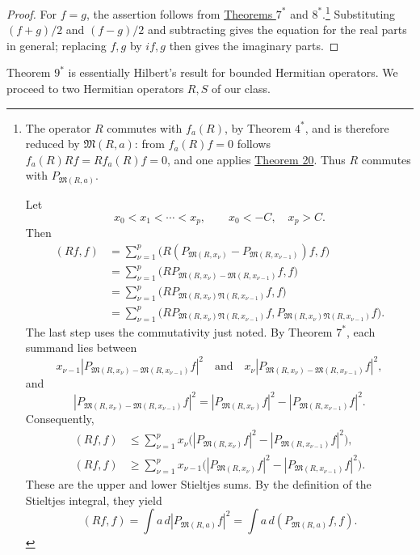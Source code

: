 ﻿\documentclass[paper=b5,fontsize=13pt,bookmarkpackage=false,twoside]{scrartcl}
\begin{document}
\begin{proof}
For \(f=g\), the assertion follows from
\hyperref[thm:appII-7]{Theorems \(7^*\)} and
\hyperref[thm:appII-8]{\(8^*\)}.\footnote{\label{fn:67}The operator \(R\) commutes
with \(f_a(R)\), by Theorem \(4^*\), and is therefore reduced by
\(\mathfrak M(R,a)\): from \(f_a(R)f=0\) follows
\(f_a(R)Rf=Rf_a(R)f=0\), and one applies \hyperref[thm:20]{Theorem 20}.  Thus \(R\)
commutes with \(P_{\mathfrak M(R,a)}\).

Let
\[
  x_0<x_1<\cdots<x_p,\qquad x_0<-C,\quad x_p>C.
\]
Then
\begin{align*}
 (Rf,f)
 &=\sum_{\nu=1}^{p}
   \bigl(R(P_{\mathfrak M(R,x_\nu)}
      -P_{\mathfrak M(R,x_{\nu-1})})f,f\bigr)\\
 &=\sum_{\nu=1}^{p}
   \bigl(RP_{\mathfrak M(R,x_\nu)-\mathfrak M(R,x_{\nu-1})}f,f\bigr)\\
 &=\sum_{\nu=1}^{p}
   \bigl(RP_{\mathfrak M(R,x_\nu)\mathfrak N(R,x_{\nu-1})}f,f\bigr)\\
 &=\sum_{\nu=1}^{p}
   \bigl(RP_{\mathfrak M(R,x_\nu)\mathfrak N(R,x_{\nu-1})}f,
         P_{\mathfrak M(R,x_\nu)\mathfrak N(R,x_{\nu-1})}f\bigr).
\end{align*}
The last step uses the commutativity just noted.  By Theorem \(7^*\),
each summand lies between
\[
 x_{\nu-1}
 |P_{\mathfrak M(R,x_\nu)-\mathfrak M(R,x_{\nu-1})}f|^2
 \quad\text{and}\quad
 x_\nu
 |P_{\mathfrak M(R,x_\nu)-\mathfrak M(R,x_{\nu-1})}f|^2,
\]
and
\[
 |P_{\mathfrak M(R,x_\nu)-\mathfrak M(R,x_{\nu-1})}f|^2
 =|P_{\mathfrak M(R,x_\nu)}f|^2
  -|P_{\mathfrak M(R,x_{\nu-1})}f|^2.
\]
Consequently,
\begin{align*}
 (Rf,f)
 &\leq\sum_{\nu=1}^{p}x_\nu
 \bigl(
 |P_{\mathfrak M(R,x_\nu)}f|^2
 -|P_{\mathfrak M(R,x_{\nu-1})}f|^2
 \bigr),\\
 (Rf,f)
 &\geq\sum_{\nu=1}^{p}x_{\nu-1}
 \bigl(
 |P_{\mathfrak M(R,x_\nu)}f|^2
 -|P_{\mathfrak M(R,x_{\nu-1})}f|^2
 \bigr).
\end{align*}
These are the upper and lower Stieltjes sums.  By the definition of
the Stieltjes integral, they yield
\[
  (Rf,f)=\int a\,d|P_{\mathfrak M(R,a)}f|^2
        =\int a\,d(P_{\mathfrak M(R,a)}f,f).
\]}
Substituting \((f+g)/2\) and \((f-g)/2\) and subtracting gives the
equation for the real parts in general; replacing \(f,g\) by \(if,g\)
then gives the imaginary parts.
\end{proof}

Theorem \(9^*\) is essentially Hilbert's result for bounded Hermitian
operators.  We proceed to two Hermitian operators \(R,S\) of our class.
\end{document}
